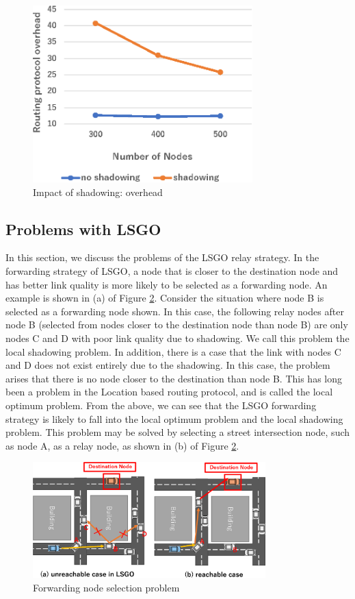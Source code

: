 \documentclass[conference]{IEEEtran}
\begin{document}
\begin{figure}[!ht]
\centering
\includegraphics[width=85mm]{figures/LSGO_overhead.eps}
\caption{Impact of shadowing: overhead}
\label{fig:LSGO-overhead}
\end{figure}

\subsection{Problems with LSGO}

In this section, we discuss the problems of the LSGO relay strategy.  
In the forwarding strategy of LSGO, a node that is closer to the destination node and has better link quality is more likely to be selected as a forwarding node. 
An example is shown in (a) of Figure \ref{fig:LSGO-route}. 
Consider the situation where node B is selected as a forwarding node shown. 
In this case, the following relay nodes after node B (selected from nodes closer to the destination node than node B) are only nodes C and D with poor link quality due to shadowing.  
We call this problem the local shadowing problem. 
In addition, there is a case that the link with nodes C and D does not exist entirely due to the shadowing.  In this case, the problem arises that there is no node closer to the destination than node B. 
This has long been a problem in the Location based routing protocol, and is called the local optimum problem. From the above, we can see that the LSGO forwarding strategy is likely to fall into the local optimum problem and the local shadowing problem. This problem may be solved by selecting a street intersection node, such as node A, as a relay node, as shown in (b) of Figure \ref{fig:LSGO-route}. 




\begin{figure}[!ht]
\centering
\includegraphics[width=90mm]{figures/efficient_route.eps}
\caption{Forwarding node selection problem}
\label{fig:LSGO-route}
\end{figure}
\end{document}
